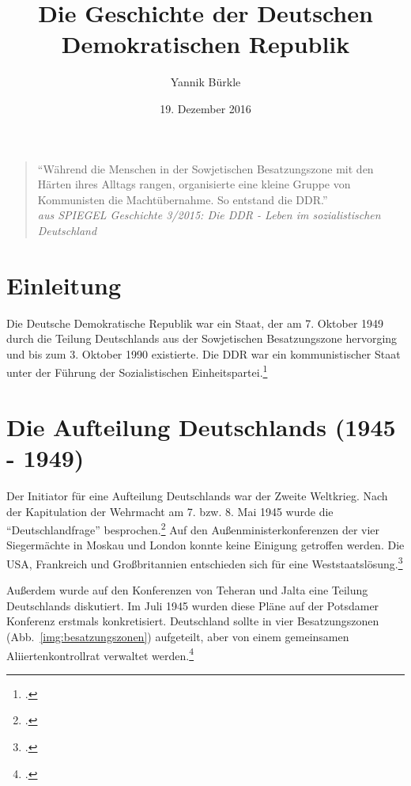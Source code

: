 \documentclass[12pt,a4paper]{article}
\title{Die Geschichte der Deutschen Demokratischen Republik}
\author{Yannik Bürkle}
\date{19. Dezember 2016}
\begin{document}
\maketitle
\newpage



\begin{quotation}
    \enquote{Während die Menschen in der Sowjetischen Besatzungszone mit den Härten ihres Alltags rangen, organisierte eine kleine Gruppe von Kommunisten die Machtübernahme. So entstand die DDR.} \\
    \textit{aus SPIEGEL Geschichte 3/2015: Die DDR - Leben im sozialistischen Deutschland}
\end{quotation}



\newpage



\tableofcontents



\newpage



\section{Einleitung}
\label{sec:einleitung}



Die Deutsche Demokratische Republik war ein Staat, der am 7. Oktober 1949 durch die Teilung Deutschlands aus der Sowjetischen Besatzungszone hervorging und bis zum 3. Oktober 1990 existierte. Die DDR war ein kommunistischer Staat unter der Führung der Sozialistischen Einheitspartei.\footcite{wiki:ddr}



\newpage



\section{Die Aufteilung Deutschlands (1945 - 1949)}
\label{sec:die-aufteilung-deutschlands}
Der Initiator für eine Aufteilung Deutschlands war der Zweite Weltkrieg. Nach der Kapitulation der Wehrmacht am 7. bzw. 8. Mai 1945 wurde die \enquote{Deutschlandfrage} besprochen.\footcite{wiki:teilung} Auf den Außenministerkonferenzen der vier Siegermächte in Moskau und London konnte keine Einigung getroffen werden. Die USA, Frankreich und Großbritannien entschieden sich für eine Weststaatslösung.\footcite{umbruch} 

Außerdem wurde auf den Konferenzen von Teheran und Jalta eine Teilung Deutschlands diskutiert. Im Juli 1945 wurden diese Pläne auf der Potsdamer Konferenz erstmals konkretisiert. Deutschland sollte in vier Besatzungszonen (Abb.~\ref{img:besatzungszonen}) aufgeteilt, aber von einem gemeinsamen Aliiertenkontrollrat verwaltet werden.\footcite{wiki:teilung}
\end{document}
